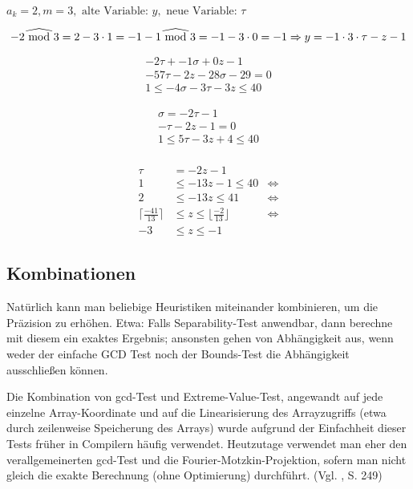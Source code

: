 \( a_k = 2, m=3, \text{ alte Variable: } y, \text{ neue Variable: } \tau \)

\[
-2 \widehat{\textrm{\ mod\ }} 3 = 2 - 3 \cdot 1 = -1 \\
-1 \widehat{\textrm{\ mod\ }} 3 = -1 -3 \cdot 0 = -1 \\
\Rightarrow y = -1 \cdot 3 \cdot \tau - z - 1
\]

\begin{align}
-2 \tau + -1 \sigma + 0 z - 1\\
-57 \tau - 2 z - 28 \sigma - 29 = 0 \\
1 \leq -4 \sigma - 3 \tau - 3 z \leq 40
\end{align}

\begin{align}
\sigma = -2 \tau - 1 \\
- \tau - 2z - 1 = 0 \\
1 \leq 5 \tau - 3 z + 4 \leq 40 \\
\end{align}

\begin{align}
 \tau & = -2z -1  & \\
1      & \leq -13z - 1  \leq 40 & \Leftrightarrow \\
2      & \leq -13z       \leq 41 & \Leftrightarrow \\
\lceil \frac{-41}{13} \rceil & \leq z  \leq \lfloor \frac{-2}{13} \rfloor & \Leftrightarrow \\
-3 & \leq z  \leq -1 &
\end{align}






\subsection{Kombinationen}

Natürlich kann man beliebige Heuristiken miteinander kombinieren, um
die Präzision zu erhöhen. Etwa: Falls Separability-Test anwendbar,
dann berechne mit diesem ein exaktes Ergebnis; ansonsten gehen von
Abhängigkeit aus, wenn weder der einfache GCD Test noch der
Bounds-Test die Abhängigkeit ausschließen können.

Die Kombination von gcd-Test und Extreme-Value-Test, angewandt auf jede
einzelne Array-Koordinate und auf die Linearisierung des Arrayzugriffs
(etwa durch zeilenweise Speicherung des Arrays) wurde aufgrund der
Einfachheit dieser Tests früher in Compilern häufig
verwendet. Heutzutage verwendet man eher den verallgemeinerten gcd-Test
und die Fourier-Motzkin-Projektion, sofern man nicht gleich die exakte
Berechnung (ohne Optimierung) durchführt. (Vgl. \cite{Wol95}, S. 249)



\def\ins{\hspace{.5cm}}
